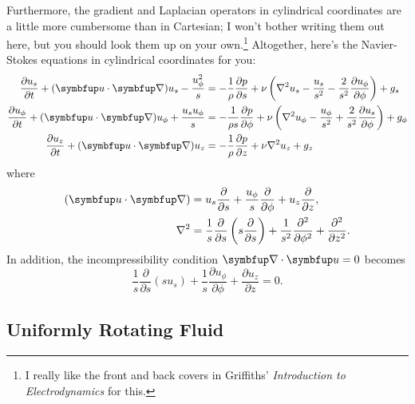 Furthermore, the gradient and Laplacian operators in cylindrical coordinates are a little more cumbersome than in Cartesian; I won't bother writing them out here, but you should look them up on your own.\footnote{I really like the front and back covers in Griffiths' \emph{Introduction to Electrodynamics} for this.}  Altogether, here's the Navier-Stokes equations in cylindrical coordinates for you:
\begin{align}
\label{eq_ns_r}
\frac {\partial u_{s}}{\partial t} + (\vec{u} \cdot \grad) u_{s} - \frac {u_{\phi}^{2}}{s} & = - \frac {1}{\rho} \frac {\partial p}{\partial s} + \nu \left (\nabla^{2} u_{s} - \frac {u_{s}}{s^{2}} - \frac {2}{s^{2}} \frac {\partial u_{\phi}}{\partial \phi} \right) +  g_s\\
\label{eq_ns_theta}
\frac {\partial u_{\phi}}{\partial t} + (\vec{u} \cdot \grad) u_{\phi} + \frac {u_{s} u_{\phi}}{s} & = - \frac {1}{\rho s} \frac {\partial p}{\partial \phi} + \nu \left (\nabla^{2} u_{\phi} - \frac {u_{\phi}}{s^{2}} + \frac {2}{s^{2}} \frac {\partial u_{s}}{\partial \phi} \right) + g_\phi\\
\label{eq_ns_z}
\frac {\partial u_{z}}{\partial t} + (\vec{u} \cdot \grad) u_{z} & = -\frac {1}{\rho} \frac {\partial p}{\partial z} + \nu \nabla^{2} u_{z} + g_z \\
\end{align}
where
\begin{align}
(\vec{u} \cdot \grad) & = u_{s} \frac {\partial}{\partial s} + \frac {u_{\phi}}{s} \frac {\partial}{\partial \phi} + u_{z} \frac {\partial}{\partial z}, \\
\nabla^{2} & = \frac {1}{s} \frac {\partial}{\partial s} \left (s \frac {\partial}{\partial s} \right) + \frac {1}{s^{2}} \frac {\partial^{2}}{\partial \phi^{2}} + \frac {\partial^{2}}{\partial z^{2}}.
\end{align}
In addition, the incompressibility condition $\grad \cdot \vec{u} = 0$ becomes 
\begin{equation}
\frac {1}{s} \frac {\partial}{\partial s} (s u_{s}) + \frac {1}{s} \frac {\partial u_{\phi}}{\partial \phi} + \frac {\partial u_{z}}{\partial z} = 0.
\end{equation}



\subsection{Uniformly Rotating Fluid}
\label{sec_uni_rot_fluid}

